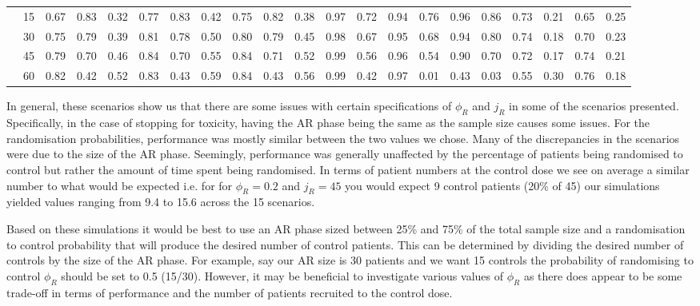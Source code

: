 \begin{table}[h!]
{\begin{tabular}[t]{ccccccccccccccccccccc}
			\hspace{1em} & 15 & 0.67 & 0.83 & 0.32 & 0.77 & 0.83 & 0.42 & 0.75 & 0.82 & 0.38 & 0.97 & 0.72 & 0.94 & 0.76 & 0.96 & 0.86 & 0.73 & 0.21 & 0.65 & 0.25\\
			
			\hspace{1em} & 30 & 0.75 & 0.79 & 0.39 & 0.81 & 0.78 & 0.50 & 0.80 & 0.79 & 0.45 & 0.98 & 0.67 & 0.95 & 0.68 & 0.94 & 0.80 & 0.74 & 0.18 & 0.70 & 0.23\\
			
			\hspace{1em} & 45 & 0.79 & 0.70 & 0.46 & 0.84 & 0.70 & 0.55 & 0.84 & 0.71 & 0.52 & 0.99 & 0.56 & 0.96 & 0.54 & 0.90 & 0.70 & 0.72 & 0.17 & 0.74 & 0.21\\
			
			\hspace{1em}\multirow{-5}{*}{\centering\arraybackslash 0.33} & 60 & 0.82 & 0.42 & 0.52 & 0.83 & 0.43 & 0.59 & 0.84 & 0.43 & 0.56 & 0.99 & 0.42 & 0.97 & 0.01 & 0.43 & 0.03 & 0.55 & 0.30 & 0.76 & 0.18\\
			\bottomrule
	\end{tabular}}
\end{table}

In general, these scenarios show us that there are some issues with certain specifications of $\phi_R$ and $j_R$ in some of the scenarios presented. Specifically, in the case of stopping for toxicity, having the AR phase being the same as the sample size causes some issues. For the randomisation probabilities, performance was mostly similar between the two values we chose. Many of the discrepancies in the scenarios were due to the size of the AR phase. Seemingly, performance was generally unaffected by the percentage of patients being randomised to control but rather the amount of time spent being randomised. In terms of patient numbers at the control dose we see on average a similar number to what would be expected i.e. for  for $\phi_R = 0.2$ and  $j_R = 45$ you would expect 9 control patients (20\% of 45) our simulations yielded values ranging from 9.4 to 15.6 across the 15 scenarios. 

Based on these simulations it would be best to use an AR phase sized between 25\% and 75\% of the total sample size and a randomisation to control probability that will produce the desired number of control patients. This can be determined by dividing the desired number of controls by the size of the AR phase. For example, say our AR size is 30 patients and we want 15 controls the probability of randomising to control $\phi_R$ should be set to 0.5 (15/30). However, it may be beneficial to investigate various values of $\phi_R$ as there does appear to be some trade-off in terms of performance and the number of patients recruited to the control dose.

